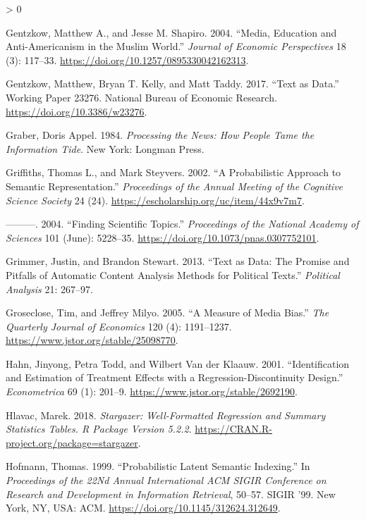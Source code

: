 \documentclass[
  12pt,
]{article}
\newlength{\cslhangindent}
\newenvironment{CSLReferences}[2] %
 {%
  \setlength{\parindent}{0pt}
  \ifodd #1 \everypar{\setlength{\hangindent}{\cslhangindent}}\ignorespaces\fi
  \ifnum #2 > 0
  \setlength{\parskip}{#2\baselineskip}
  \fi
 }%
 {}
\begin{document}
\begin{CSLReferences}{1}{0}
\leavevmode\hypertarget{ref-gentzkow_media_2004}{}%
Gentzkow, Matthew A., and Jesse M. Shapiro. 2004. {``Media, Education
and Anti-Americanism in the Muslim World.''} \emph{Journal of Economic
Perspectives} 18 (3): 117--33.
\url{https://doi.org/10.1257/0895330042162313}.

\leavevmode\hypertarget{ref-gentzkow_text_2017}{}%
Gentzkow, Matthew, Bryan T. Kelly, and Matt Taddy. 2017. {``Text as
Data.''} Working Paper 23276. National Bureau of Economic Research.
\url{https://doi.org/10.3386/w23276}.

\leavevmode\hypertarget{ref-graber_processing_1984}{}%
Graber, Doris Appel. 1984. \emph{Processing the News: How People Tame
the Information Tide}. New York: Longman Press.

\leavevmode\hypertarget{ref-griffiths_probabilistic_2002}{}%
Griffiths, Thomas L., and Mark Steyvers. 2002. {``A Probabilistic
Approach to Semantic Representation.''} \emph{Proceedings of the Annual
Meeting of the Cognitive Science Society} 24 (24).
\url{https://escholarship.org/uc/item/44x9v7m7}.

\leavevmode\hypertarget{ref-griffiths_finding_2004}{}%
---------. 2004. {``Finding Scientific Topics.''} \emph{Proceedings of
the National Academy of Sciences} 101 (June): 5228--35.
\url{https://doi.org/10.1073/pnas.0307752101}.

\leavevmode\hypertarget{ref-grimmer_text_2013}{}%
Grimmer, Justin, and Brandon Stewart. 2013. {``Text as Data: The Promise
and Pitfalls of Automatic Content Analysis Methods for Political
Texts.''} \emph{Political Analysis} 21: 267--97.

\leavevmode\hypertarget{ref-groseclose_measure_2005}{}%
Groseclose, Tim, and Jeffrey Milyo. 2005. {``A Measure of Media Bias.''}
\emph{The Quarterly Journal of Economics} 120 (4): 1191--1237.
\url{https://www.jstor.org/stable/25098770}.

\leavevmode\hypertarget{ref-hahn_identification_2001}{}%
Hahn, Jinyong, Petra Todd, and Wilbert Van der Klaauw. 2001.
{``Identification and Estimation of Treatment Effects with a
Regression-Discontinuity Design.''} \emph{Econometrica} 69 (1): 201--9.
\url{https://www.jstor.org/stable/2692190}.

\leavevmode\hypertarget{ref-hlavac_stargazer_2018}{}%
Hlavac, Marek. 2018. \emph{Stargazer: Well-Formatted Regression and
Summary Statistics Tables. R Package Version 5.2.2}.
\url{https://CRAN.R-project.org/package=stargazer}.

\leavevmode\hypertarget{ref-hofmann_probabilistic_1999}{}%
Hofmann, Thomas. 1999. {``Probabilistic Latent Semantic Indexing.''} In
\emph{Proceedings of the 22Nd Annual International {ACM} {SIGIR}
Conference on Research and Development in Information Retrieval},
50--57. {SIGIR} '99. New York, {NY}, {USA}: {ACM}.
\url{https://doi.org/10.1145/312624.312649}.


\end{CSLReferences}
\end{document}
